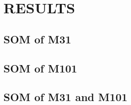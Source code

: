 \section{RESULTS}
   \subsection{SOM of M31}
   \subsection{SOM of M101}
   \subsection{SOM of M31 and M101}
